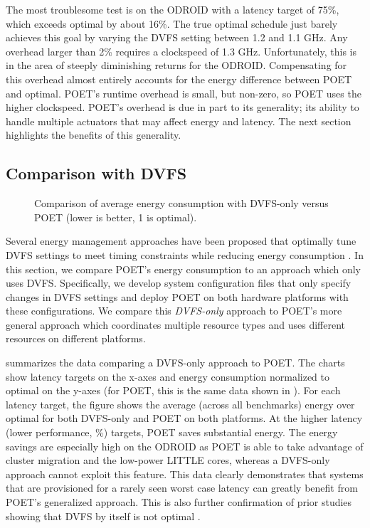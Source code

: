 The most troublesome test is  on the ODROID with a latency target of 75\%, which exceeds optimal by about 16\%.
The true optimal schedule just barely achieves this goal by varying the DVFS setting between 1.2 and 1.1 GHz.
Any overhead larger than 2\% requires a clockspeed of 1.3 GHz.
Unfortunately, this is in the area of steeply diminishing returns for the ODROID.
Compensating for this overhead almost entirely accounts for the energy difference between POET and optimal.
POET's runtime overhead is small, but non-zero, so POET uses the higher clockspeed.
POET's overhead is due in part to its generality; \ie its ability to handle multiple actuators that may affect energy and latency.
The next section highlights the benefits of this generality.


\subsection{Comparison with DVFS}

\begin{figure}[t]
  \centering
  
  \caption{Comparison of average energy consumption with DVFS-only versus POET (lower is better, 1 is optimal).}
  \label{fig:poet-embedded-dvfs-compare}
\end{figure}

Several energy management approaches have been proposed that optimally tune DVFS settings to meet timing constraints while reducing energy consumption \cite{Albers}.
In this section, we compare POET's energy consumption to an approach which only uses DVFS.
Specifically, we develop system configuration files that only specify changes in DVFS settings and deploy POET on both hardware platforms with these configurations.
We compare this \emph{DVFS-only} approach to POET's more general approach which coordinates multiple resource types and uses different resources on different platforms.

 summarizes the data comparing a DVFS-only approach to POET.
The charts show latency targets on the x-axes and energy consumption normalized to optimal on the y-axes (for POET, this is the same data shown in ).
For each latency target, the figure shows the average (across all benchmarks) energy over optimal for both DVFS-only and POET on both platforms.
At the higher latency (lower performance, \%) targets, POET saves substantial energy.
The energy savings are especially high on the ODROID as POET is able to take advantage of cluster migration and the low-power LITTLE cores, whereas a DVFS-only approach cannot exploit this feature.
This data clearly demonstrates that systems that are provisioned for a rarely seen worst case latency can greatly benefit from POET's generalized approach.
This is also further confirmation of prior studies showing that DVFS by itself is not optimal \cite{Hoffmann2012,MeisnerISCA2011}.


